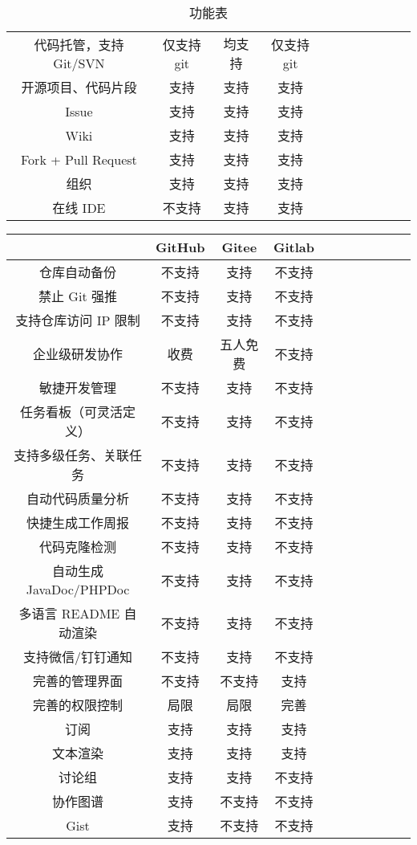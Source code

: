 \documentclass{homework}
\begin{document}
\begin{itemize}
\begin{table}[!htbp]
\begin{tabular}{ccccccccccc}
				\midrule
				代码托管，支持 Git/SVN& 仅支持git & 均支持& 仅支持git	\\	
				开源项目、代码片段& 支持 &支持&支持		\\
				Issue& 	支持 &支持&支持		\\
				Wiki& 	支持 &支持&支持		\\
				Fork + Pull Request	& 支持 &支持&支持		\\
				组织& 	支持 &支持&支持		\\
				在线 IDE& 不支持& 支持& 支持\\
				\bottomrule
			\end{tabular}
			\caption{功能表}
		\end{table}
		\begin{table}[!htbp]
			\centering
			\begin{tabular}{ccccccccccc}
			\toprule  
			 & \textbf{GitHub}& \textbf{Gitee}& \textbf{Gitlab}\\
				\midrule
				仓库自动备份& 	不支持& 支持& 不支持&\\
				禁止 Git 强推& 	不支持&  支持& 不支持&\\
				支持仓库访问 IP 限制& 不支持& 支持& 不支持&\\
				企业级研发协作& 收费 &五人免费& 不支持&\\
				敏捷开发管理& 不支持&	支持&	不支持&\\
				任务看板（可灵活定义）& 不支持& 支持& 不支持&\\		
				支持多级任务、关联任务& 不支持& 支持& 不支持&\\		
				自动代码质量分析& 不支持& 支持&	不支持&\\	
				快捷生成工作周报& 不支持& 支持&	不支持&\\	
				代码克隆检测& 不支持& 支持&	不支持&\\
				自动生成 JavaDoc/PHPDoc	& 不支持& 支持&	不支持&\\
				多语言 README 自动渲染& 不支持&	 支持& 不支持&\\	
				支持微信/钉钉通知& 	不支持&	支持& 不支持&\\
				完善的管理界面& 不支持& 不支持& 支持\\
				完善的权限控制& 局限& 局限& 完善\\
				订阅& 支持& 支持& 支持\\
				文本渲染&支持&支持&支持\\
				讨论组&支持&支持&不支持\\
				协作图谱&支持&不支持&不支持\\
				Gist&支持&不支持&不支持\\

\end{tabular}
\end{table}
\end{itemize}
\end{document}
